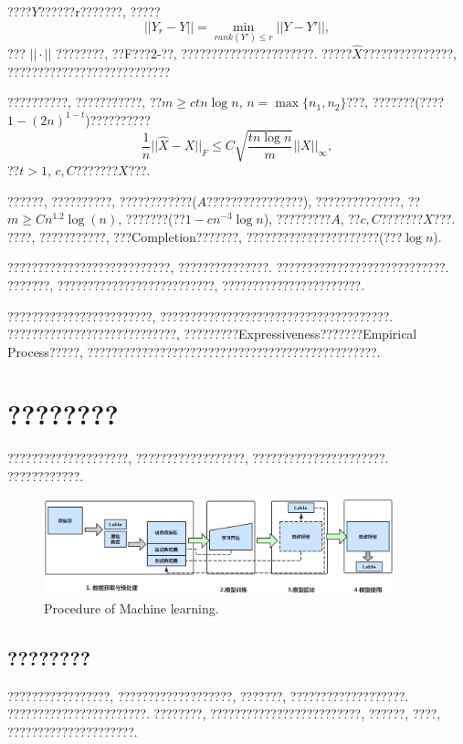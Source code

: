 \documentclass[lang=cn,11pt,a4paper]{elegantpaper}
\begin{document}
????$Y$??????r???????, ????? 
\begin{equation}
||Y_r-Y||=\min_{rank(Y')\leq r}||Y-Y'||,
\end{equation}
??? $||\cdot||$ ????????, ??F???2-??, ??????????????????????. ?????$\hat X$???????????????, ???????????????????????????
\par ??????????, ???????????, ??$m\geq ctn\log n,\, n=\max\{n_1,n_2\}$???, ???????(????$1-(2n)^{1-t}$)??????????
\begin{equation}
	\dfrac{1}{n}||\hat X -X||_F\leq C\sqrt{\dfrac{tn\log n}{m}}||X||_{\infty},
\end{equation}
 ??$t>1$, $c,C$???????$X$???\cite{Recht2011}. 
 
 \par ??????, ??????????, ????????????($A$????????????????), ??????????????, ??$m\geq C n^{1.2} \log(n)$, ???????(??$1-cn^{-3}\log n$), ?????????$A$, ??$c,C$???????$X$???\cite{Candes2009}. ????, ???????????, ???Completion???????, ??????????????????????(???$\log n$)\cite{Candes2010}.
\par ???????????????????????????, ???????????????. ????????????????????????????. ???????, ??????????????????????????, ???????????????????????. 
\par ????????????????????????, ??????????????????????????????????????. ????????????????????????????, ?????????Expressiveness\cite{Yarotsky2017}???????Empirical Process\cite{Vapnik1994}?????, ????????????????????????????????????????????????.
\section{????????}
????????????????????, ??????????????????, ??????????????????????.  ????????????.
\begin{figure}[htbp]
	\centering
	\includegraphics[width=0.9\textwidth]{555}
  	\caption{Procedure of Machine learning.\label{fig:buzhou}}
\end{figure}
\subsection{????????}
?????????????????, ???????????????????, ???????, ???????????????????. ???????????????????????. ????????, ?????????????????????????, ??????, ????, ?????????????????????.
\end{document}
